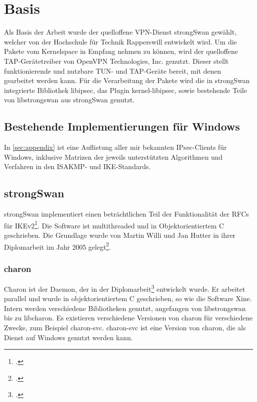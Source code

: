 


\section{Basis}
Als Basis der Arbeit wurde der quelloffene VPN-Dienst strongSwan gewählt,
welcher von der Hochschule für Technik Rapperswill entwickelt wird.
Um die Pakete vom Kernelspace in Empfang nehmen zu können, wird der quelloffene
TAP-Gerätetreiber von OpenVPN Technologies, Inc. genutzt. Dieser stellt funktionierende
und nutzbare TUN- und TAP-Geräte bereit, mit denen gearbeitet werden kann.
Für die Verarbeitung der Pakete wird die in strongSwan integrierte Bibliothek libipsec,
das Plugin kernel-libipsec, sowie bestehende Teile von libstrongswan
aus strongSwan genutzt.

\subsection{Bestehende Implementierungen für Windows}

In \autoref{sec:appendix} ist eine Auflistung aller mir bekannten IPsec-Clients für Windows,
inklusive Matrizen der jeweils unterstützten Algorithmen und Verfahren in den ISAKMP-
und IKE-Standards.

\subsection{strongSwan}
strongSwan implementiert einen beträchtlichen Teil der Funktionalität der \acp{RFC} für IKEv2\footcite{_ipsecstandards_2016}.
Die Software ist multithreaded und in Objektorientiertem C geschrieben.
Die Grundlage wurde von Martin Willi und Jan Hutter in ihrer Diplomarbeit im Jahr 2005 gelegt\footcite[][]{jan_hutter_strongswan_2005}.
\subsubsection{charon}
Charon ist der Daemon, der in der Diplomarbeit\footcite[][]{jan_hutter_strongswan_2005} entwickelt wurde.
Er arbeitet parallel und wurde in objektorientiertem C geschrieben, so wie die Software Xine.
Intern werden verschiedene Bibliotheken genutzt, angefangen von libstrongswan bis zu libcharon.
Es existieren verschiedene Versionen von charon für verschiedene Zwecke, zum Beispiel
charon-svc. charon-svc ist eine Version von charon, die als Dienst auf Windows genutzt werden kann.

